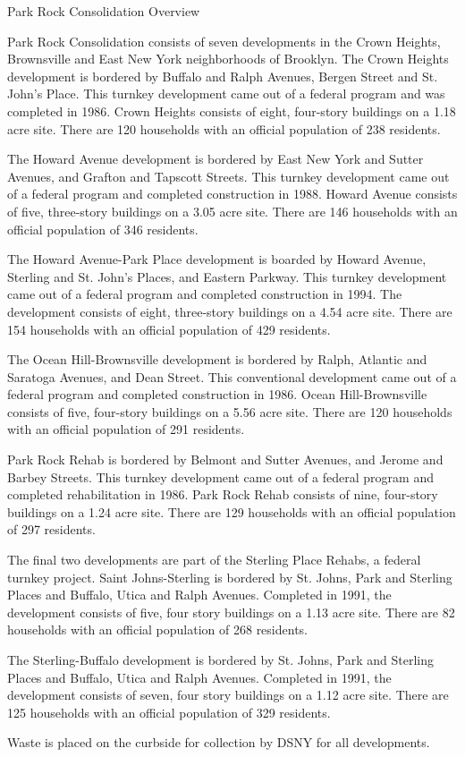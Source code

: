 Park Rock Consolidation Overview

Park Rock Consolidation consists of seven developments in the Crown Heights, Brownsville and East New York neighborhoods of Brooklyn. The Crown Heights development is bordered by Buffalo and Ralph Avenues, Bergen Street and St. John's Place. This turnkey development came out of a federal program and was completed in 1986. Crown Heights consists of eight, four-story buildings on a 1.18 acre site. There are 120 households with an official population of 238 residents. 

The Howard Avenue development is bordered by East New York and Sutter Avenues, and Grafton and Tapscott Streets. This turnkey development came out of a federal program and completed construction in 1988. Howard Avenue consists of five, three-story buildings on a 3.05 acre site. There are 146 households with an official population of 346 residents.

The Howard Avenue-Park Place development is boarded by Howard Avenue, Sterling and St. John's Places, and Eastern Parkway. This turnkey development came out of a federal program and completed construction in 1994. The development consists of eight, three-story buildings on a 4.54 acre site. There are 154 households with an official population of 429 residents. 

The Ocean Hill-Brownsville development is bordered by Ralph, Atlantic and Saratoga Avenues, and Dean Street. This conventional development came out of a federal program and completed construction in 1986. Ocean Hill-Brownsville consists of five, four-story buildings on a 5.56 acre site. There are 120 households with an official population of 291 residents.

Park Rock Rehab is bordered by Belmont and Sutter Avenues, and Jerome and Barbey Streets. This turnkey development came out of a federal program and completed rehabilitation in 1986. Park Rock Rehab consists of nine, four-story buildings on a 1.24 acre site. There are 129 households with an official population of 297 residents. 

The final two developments are part of the Sterling Place Rehabs, a federal turnkey project. Saint Johns-Sterling is bordered by St. Johns, Park and Sterling Places and Buffalo, Utica and Ralph Avenues. Completed in 1991, the development consists of five, four story buildings on a 1.13 acre site. There are 82 households with an official population of 268 residents. 

The Sterling-Buffalo development is bordered by St. Johns, Park and Sterling Places and Buffalo, Utica and Ralph Avenues. Completed in 1991, the development consists of seven, four story buildings on a 1.12 acre site. There are 125 households with an official population of 329 residents.

Waste is placed on the curbside for collection by DSNY for all developments.